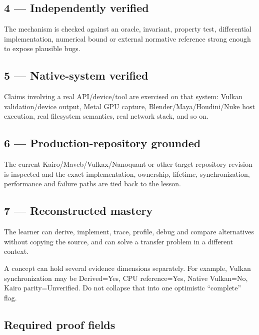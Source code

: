 \subsection{4 --- Independently verified}\label{independently-verified}

The mechanism is checked against an oracle, invariant, property test, differential implementation, numerical bound or external normative reference strong enough to expose plausible bugs.

\subsection{5 --- Native-system verified}\label{native-system-verified}

Claims involving a real API/device/tool are exercised on that system: Vulkan validation/device output, Metal GPU capture, Blender/Maya/Houdini/Nuke host execution, real filesystem semantics, real network stack, and so on.

\subsection{6 --- Production-repository grounded}\label{production-repository-grounded}

The current Kairo/Maveb/Vulkax/Nanoquant or other target repository revision is inspected and the exact implementation, ownership, lifetime, synchronization, performance and failure paths are tied back to the lesson.

\subsection{7 --- Reconstructed mastery}\label{reconstructed-mastery}

The learner can derive, implement, trace, profile, debug and compare alternatives without copying the source, and can solve a transfer problem in a different context.

A concept can hold several evidence dimensions separately. For example, Vulkan synchronization may be Derived=Yes, CPU reference=Yes, Native Vulkan=No, Kairo parity=Unverified. Do not collapse that into one optimistic ``complete'' flag.

\subsection{Required proof fields}\label{required-proof-fields}

